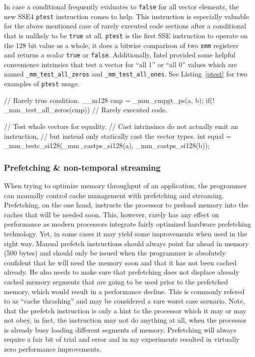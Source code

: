 In case a conditional frequently evaluates to \texttt{false} for all vector elements, the new SSE4 \texttt{ptest} instruction comes to help. This instruction is especially valuable for the above mentioned case of rarely executed code sections after a conditional that is unlikely to be \texttt{true} at all. \texttt{ptest} is the first SSE instruction to operate on the 128 bit value as a whole, it does a bitwise comparison of two \texttt{xmm} registers and returns a scalar \texttt{true} or \texttt{false}. Additionally, Intel provided some helpful convenience intrinsics that test a vector for ``all 1'' or ``all 0'' values which are named \texttt{\_mm\_test\_all\_zeros} and \texttt{\_mm\_test\_all\_ones}. See Listing~\ref{ptest} for two examples of \texttt{ptest} usage.

\begin{code}[caption={Examples of \texttt{ptest} usage},label=ptest]
// Rarely true condition.
__m128 cmp = _mm_cmpgt_ps(a, b);
if(! _mm_test_all_zeros(cmp)) {
  // Rarely executed code.
}

// Test whole vectors for equality.
// Cast intrinsincs do not actually emit an instruction,
// but instead only statically cast the vector types.
int equal = _mm_testc_si128(_mm_castps_si128(a), _mm_castps_si128(b));
\end{code}

\subsubsection{Prefetching \& non-temporal streaming}

When trying to optimize memory throughput of an application, the programmer can manually control cache management with prefetching and streaming. Prefetching, on the one hand, instructs the processor to preload memory into the caches that will be needed soon. This, however, rarely has any effect on performance as modern processors integrate fairly optimized hardware prefetching technology. Yet, in some cases it may yield some improvements when used in the right way. Manual prefetch instructions should always point far ahead in memory (\eg{}500 bytes) and should only be issued when the programmer is absolutely confident that he will need the memory soon and that it has not been cached already. He also needs to make sure that prefetching does not displace already cached memory segments that are going to be used prior to the prefetched memory, which would result in a performance decline. This is commonly refered to as ``cache thrashing'' and may be considered a rare worst case scenario. Note, that the prefetch instruction is only a hint to the processor which it may or may not obey, in fact, the instruction may not do anything at all, when the processor is already busy loading different segments of memory. Prefetching will always require a fair bit of trial and error and in my experiments resulted in virtually zero performance improvements.

